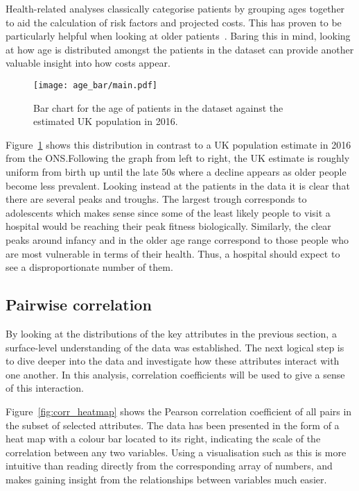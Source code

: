 Health-related analyses classically categorise patients by grouping ages
together to aid the calculation of risk factors and projected costs. This has
proven to be particularly helpful when looking at older
patients~\cite{Billings327}. Baring this in mind, looking at how age is
distributed amongst the patients in the dataset can provide another valuable
insight into how costs appear.

\begin{figure}[htbp]
    \centering
    \texttt{[image: age\_bar/main.pdf]}
    \caption{Bar chart for the age of patients in the dataset against the
        estimated UK population in 2016.}%
    \label{fig:age_bar}
\end{figure}

Figure~\ref{fig:age_bar} shows this distribution in contrast to a UK population
estimate in 2016 from the ONS.\@ Following the graph from left to right, the UK
estimate is roughly uniform from birth up until the late 50s where a decline
appears as older people become less prevalent. Looking instead at the patients
in the data it is clear that there are several peaks and troughs. The largest
trough corresponds to adolescents which makes sense since some of the least
likely people to visit a hospital would be reaching their peak fitness
biologically. Similarly, the clear peaks around infancy and in the older age
range correspond to those people who are most vulnerable in terms of their
health. Thus, a hospital should expect to see a disproportionate number of them.


\subsection{Pairwise correlation}\label{subsec:corr}

By looking at the distributions of the key attributes in the previous section,
a surface-level understanding of the data was established. The next logical step
is to dive deeper into the data and investigate how these attributes interact
with one another. In this analysis, correlation coefficients will be used to
give a sense of this interaction.

Figure~\ref{fig:corr_heatmap} shows the Pearson correlation coefficient of all
pairs in the subset of selected attributes. The data has been presented in the
form of a heat map with a colour bar located to its right, indicating the scale
of the correlation between any two variables. Using a visualisation such as this
is more intuitive than reading directly from the corresponding array of numbers,
and makes gaining insight from the relationships between variables much easier.

